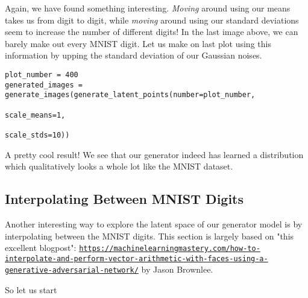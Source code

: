 \documentclass[%
oneside,                 %
final,                   %
10pt]{article}
\begin{document}
Again, we have found something interesting. \emph{Moving} around using our means
takes us from digit to digit, while \emph{moving} around using our standard
deviations seem to increase the number of different digits! In the last image
above, we can barely make out every MNIST digit. Let us make on last plot using
this information by upping the standard deviation of our Gaussian noises.






\begin{verbatim}
plot_number = 400
generated_images = generate_images(generate_latent_points(number=plot_number,
                                                          scale_means=1,
                                                          scale_stds=10))

\end{verbatim}

A pretty cool result! We see that our generator indeed has learned a
distribution which qualitatively looks a whole lot like the MNIST dataset.

\subsection*{Interpolating Between MNIST Digits}
Another interesting way to explore the latent space of our generator model is by
interpolating between the MNIST digits. This section is largely based on
"this excellent blogpost": \href{{https://machinelearningmastery.com/how-to-interpolate-and-perform-vector-arithmetic-with-faces-using-a-generative-adversarial-network/}}{\nolinkurl{https://machinelearningmastery.com/how-to-interpolate-and-perform-vector-arithmetic-with-faces-using-a-generative-adversarial-network/}}
by Jason Brownlee.

So let us start

\end{document}
